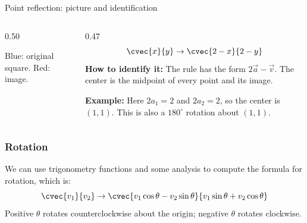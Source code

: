 \begin{frame}{Point reflection: picture and identification}
\begin{columns}[T]
\begin{column}{0.50\textwidth}
\centering
{}

\small Blue: original square. Red: image.
\end{column}
\begin{column}{0.47\textwidth}
\small
\[ \cvec{x}{y}\to\cvec{2-x}{2-y} \]
\textbf{How to identify it:} The rule has the form $2\vec{a}-\vec{v}$. The center is the midpoint of every point and its image.

\medskip
\textbf{Example:} Here $2a_1=2$ and $2a_2=2$, so the center is $(1,1)$. This is also a $180^\circ$ rotation about $(1,1)$.
\end{column}
\end{columns}
\end{frame}


\begin{frame}
\frametitle{Rotation}
We can use trigonometry functions and some analysis to compute the formula for rotation, which is:
\[ \cvec{v_1}{v_2} \to \cvec{v_1\cos\theta - v_2\sin\theta}{v_1\sin\theta + v_2\cos\theta}\]
Positive $\theta$ rotates counterclockwise about the origin; negative $\theta$ rotates clockwise.
\end{frame}

